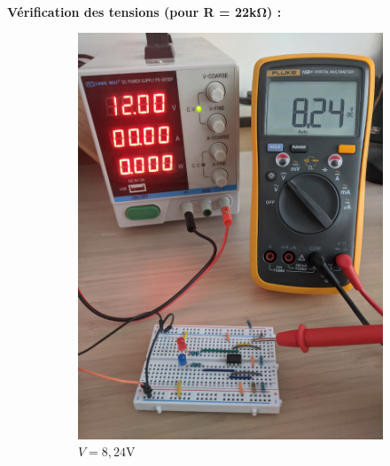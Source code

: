 \documentclass{article}
\begin{document}
\paragraph{}
\textbf{Vérification des tensions (pour R = 22\si{\kilo\ohm}) :}
\begin{figure}[H]
    \centering
    \begin{subfigure}{.3\textwidth}
        \centering
        \includegraphics[width=\linewidth]{./images/labo4-22k-V.jpg}  
        \caption{$V = 8,24\si{\volt}$}
    \end{subfigure}
    \begin{subfigure}{.3\textwidth}
        \centering

\end{subfigure}
\end{figure}
\end{document}
